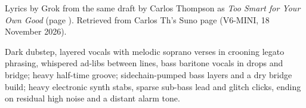 
\label{sec:too-smart-for-your-own-good-dubstep}
\begin{notes}
Lyrics by Grok from the same draft by Carlos Thompson as \emph{Too Smart for Your Own Good} (page \pageref{sec:too-smart-for-your-own-good}). Retrieved from Carlos Th's Suno page (V6-MINI, 18 November 2026).
\end{notes}
\begin{style}
Dark dubstep, layered vocals with melodic soprano verses in crooning legato phrasing, whispered ad-libs between lines, bass baritone vocals in drops and bridge; heavy half-time groove; sidechain-pumped bass layers and a dry bridge build; heavy electronic synth stabs, sparse sub-bass lead and glitch clicks, ending on residual high noise and a distant alarm tone.
\end{style}
